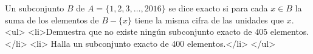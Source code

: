 Un subconjunto $B$ de $A=\{1,2,3,\dots,2016\}$ se dice exacto si para cada $x\in B$ la suma de los elementos de $B-\{x\}$ tiene la misma cifra de las unidades que $x$.
<ul>
<li>Demuestra que no existe ningún subconjunto exacto de $405$ elementos. </li>
<li> Halla un subconjunto exacto de $400$ elementos.</li>
</ul>